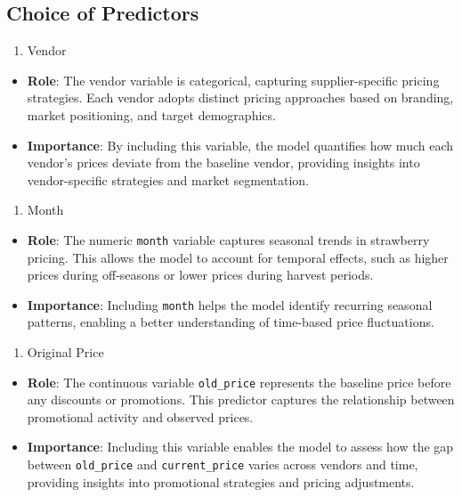 \documentclass[
  letterpaper,
  DIV=11,
  numbers=noendperiod]{scrartcl}
\providecommand{\tightlist}{%
  \setlength{\itemsep}{0pt}\setlength{\parskip}{0pt}}\usepackage{longtable,booktabs,array}
\begin{document}
\subsection{Choice of Predictors}\label{choice-of-predictors}

\begin{enumerate}
\def\labelenumi{\arabic{enumi}.}
\tightlist
\item
  Vendor
\end{enumerate}

\begin{itemize}
\item
  \textbf{Role}: The vendor variable is categorical, capturing
  supplier-specific pricing strategies. Each vendor adopts distinct
  pricing approaches based on branding, market positioning, and target
  demographics.
\item
  \textbf{Importance}: By including this variable, the model quantifies
  how much each vendor's prices deviate from the baseline vendor,
  providing insights into vendor-specific strategies and market
  segmentation.
\end{itemize}

\begin{enumerate}
\def\labelenumi{\arabic{enumi}.}
\setcounter{enumi}{1}
\tightlist
\item
  Month
\end{enumerate}

\begin{itemize}
\item
  \textbf{Role}: The numeric \texttt{month} variable captures seasonal
  trends in strawberry pricing. This allows the model to account for
  temporal effects, such as higher prices during off-seasons or lower
  prices during harvest periods.
\item
  \textbf{Importance}: Including \texttt{month} helps the model identify
  recurring seasonal patterns, enabling a better understanding of
  time-based price fluctuations.
\end{itemize}

\begin{enumerate}
\def\labelenumi{\arabic{enumi}.}
\setcounter{enumi}{2}
\tightlist
\item
  Original Price
\end{enumerate}

\begin{itemize}
\item
  \textbf{Role}: The continuous variable \texttt{old\_price} represents
  the baseline price before any discounts or promotions. This predictor
  captures the relationship between promotional activity and observed
  prices.
\item
  \textbf{Importance}: Including this variable enables the model to
  assess how the gap between \texttt{old\_price} and
  \texttt{current\_price} varies across vendors and time, providing
  insights into promotional strategies and pricing adjustments.
\end{itemize}
\end{document}
